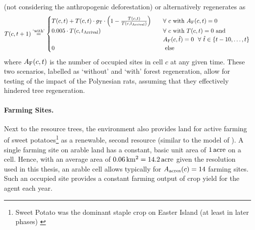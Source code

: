 (not considering the anthropogenic deforestation) or alternatively regenerates as
\begin{equation}\label{eq:treeupdate}
T(c,t+1)\stackrel{\text{`with'}}{=} \begin{cases}
T(c,t) + T(c,t) \cdot g_{\rm T} \cdot \left(1- \frac{T(c,t)}{T(c,t_{\rm Arrival})}\right) \quad & \forall \ c \text{ with } A_{\rm F}(c,t)=0 \\
0.005 \cdot T(c,t_{\rm Arrival})  & \forall  \ c \text{ with } T(c,t)=0 \text{ and}\\
& A_{\rm F}(c,\hat{t})=0 \  \ \forall \  \hat{t} \in \{t-10, \ldots, t\} \\
0 & \text{ else }
\end{cases}
\end{equation}
where $A_{\rm F}(c,t)$ is the number of occupied sites in cell $c$ at any given time. 
These two scenarios, labelled as `without' and `with' forest regeneration, allow for testing of the impact of the Polynesian rats, assuming that they effectively hindered tree regeneration.

\paragraph{Farming Sites.}
Next to the resource trees, the environment also provides land for active farming of sweet potatoes\footnote{Sweet Potato was the dominant staple crop on Easter Island (at least in later phases) \citep{Louwagie2006}} as a renewable, second resource (similar to the model of ).
A single farming site on arable land has a constant, basic unit area of $1\, {\rm acre}$ on a cell. 
Hence, with an average area of $0.06\, {\rm km^2} = 14.2\, {\rm acre}$ given the resolution used in this thesis, an arable cell allows typically for $A_{\rm acres}(c)=14$ farming sites.
Such an occupied site provides a constant farming output of crop yield for the agent each year. 

